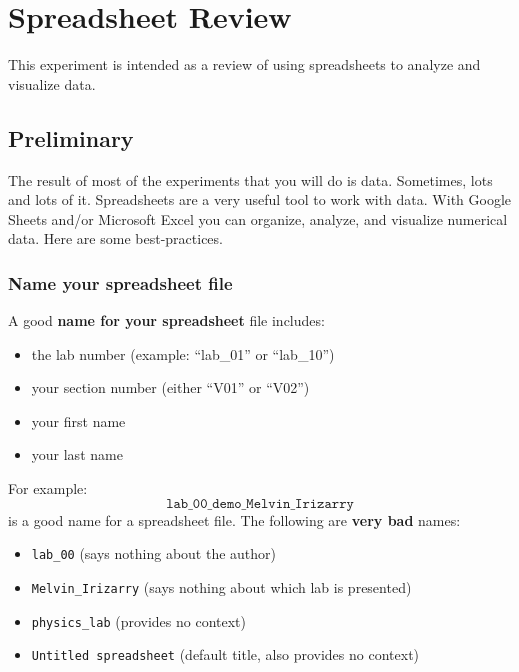 \setcounter{chapter}{0}
\chapter{Spreadsheet Review}
This experiment is intended as a review of using spreadsheets to analyze and visualize data.
\section{Preliminary}
The result of most of the experiments that you will do is data. Sometimes, lots and lots of it. Spreadsheets are a very useful tool to work with data. With Google Sheets and/or Microsoft Excel you can organize, analyze, and visualize numerical data. Here are some best-practices.
\subsection{Name your spreadsheet file}
A good \textbf{name for your spreadsheet} file includes:
\begin{itemize}
    \item the lab number (example: ``lab\_01'' or ``lab\_10'')
    \item your section number (either ``V01'' or ``V02'')
    \item your first name
    \item your last name
\end{itemize}
For example:
\begin{equation}
    \texttt{lab\_00\_demo\_Melvin\_Irizarry}
\end{equation}
is a good name for a spreadsheet file. The following are \textbf{very bad} names:
\begin{itemize}
    \item \texttt{lab\_00} (says nothing about the author)
    \item \texttt{Melvin\_Irizarry} (says nothing about which lab is presented)
    \item \texttt{physics\_lab} (provides no context)
    \item \texttt{Untitled spreadsheet} (default title, also provides no context)
\end{itemize}
